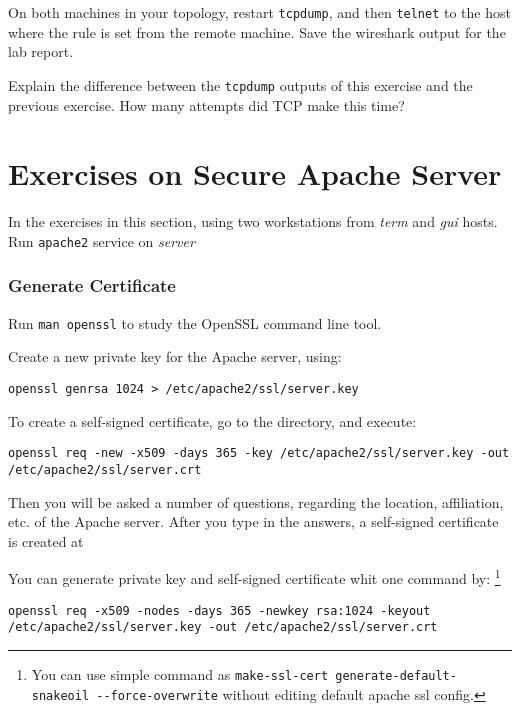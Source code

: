 \documentclass{../UTNetLab}
\begin{document}
    On both machines in your topology, restart \lstinline{tcpdump}, and then \lstinline{telnet} to the host where the rule is set from the remote machine. Save the wireshark output for the lab report.
    
    \begin{report}
    \item Explain the difference between the \lstinline{tcpdump} outputs of this exercise and the previous exercise. How many attempts did {TCP} make this time?
    \end{report}

\part{Exercises on Secure Apache Server}
    In the exercises in this section, using two workstations from \textit{term} and \textit{gui} hosts. Run \lstinline{apache2} service on \textit{server}

\section{Generate Certificate}
    Run \lstinline{man openssl} to study the OpenSSL command line tool.

    Create a new private key for the Apache server, using:
    \begin{lstlisting}
openssl genrsa 1024 > /etc/apache2/ssl/server.key
    \end{lstlisting}
    To create a self-signed certificate, go to the  directory, and execute:
    \begin{lstlisting}
openssl req -new -x509 -days 365 -key /etc/apache2/ssl/server.key -out /etc/apache2/ssl/server.crt
    \end{lstlisting}
    Then you will be asked a number of questions, regarding the location, affiliation, etc. of the Apache server. After you type in the answers, a self-signed certificate is created at 

    You can generate private key and self-signed certificate whit one command by:
    \footnote{You can use simple command as \lstinline{make-ssl-cert generate-default-snakeoil --force-overwrite} without editing default apache ssl config.}
    \begin{lstlisting}
openssl req -x509 -nodes -days 365 -newkey rsa:1024 -keyout /etc/apache2/ssl/server.key -out /etc/apache2/ssl/server.crt
    \end{lstlisting}
\end{document}

